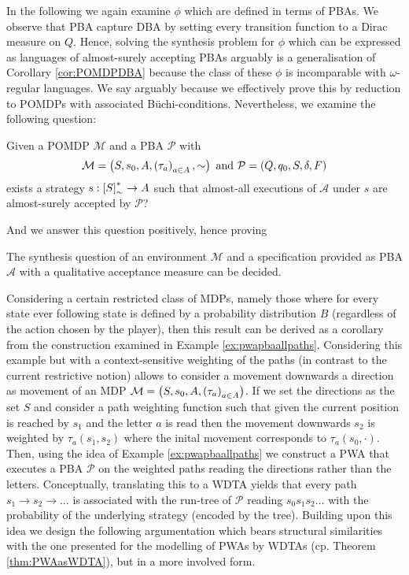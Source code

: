In the following we again examine $\phi$ which are defined in terms of 
\acp{PBA}. We observe that \ac{PBA} capture \ac{DBA} by setting every 
transition function to a Dirac measure on $Q$. Hence, solving the synthesis 
problem for $\phi$ which can be expressed as languages of almost-surely 
accepting \acp{PBA} arguably is a generalisation of Corollary 
\ref{cor:POMDPDBA} because the class of these $\phi$ is incomparable with 
$\omega$-regular languages. We say arguably because we effectively prove this
by reduction to \acp{POMDP} with associated Büchi-conditions. Nevertheless, we 
examine the following question:
\begin{definition}
  Given a \ac{POMDP} $\mathcal{M}$ and a \ac{PBA} $\mathcal{P}$ with
  \begin{equation*}
    \mathcal{M} = \left(S, s_{0}, A, \left(\tau_{a}\right)_{a\in A}, \sim\right)
  \text{ and }
    \mathcal{P} = \left(Q, q_{0}, S, \delta, F\right)
  \end{equation*}
  exists a strategy $s:\left[S\right]_{\sim}^{*}\rightarrow A$ such that 
  almost-all executions of $\mathcal{A}$ under $s$ are almost-surely accepted 
  by $\mathcal{P}$?
  \label{def:pbastratsynthesis}
\end{definition}
And we answer this question positively, hence proving
\begin{theorem}
  The synthesis question of an environment $\mathcal{M}$ and a specification
  provided as \ac{PBA} $\mathcal{A}$ with a qualitative acceptance measure
  can be decided.
  \label{thm:pbasynthesis}
\end{theorem}
Considering a certain restricted class of \acp{MDP}, namely those where for 
every state ever following state is defined by a probability distribution $B$
(regardless of the action chosen by the player), then this result can be 
derived as a corollary from the construction examined in Example 
\ref{ex:pwapbaallpaths}. Considering this example but with a context-sensitive
weighting of the paths (in contrast to the current restrictive notion) allows 
to consider a movement downwards a direction as movement of an \ac{MDP} 
$\mathcal{M} = \left(S, s_{0}, A, \left(\tau_{a}\right)_{a\in A}\right)$. If we set the
directions as the set $S$ and consider a path weighting function such that
given the current position is reached by $s_{1}$ and the letter $a$ is read 
then the movement downwards $s_{2}$ is weighted by $\tau_{a}(s_{1}, s_{2})$ 
where the inital movement corresponds to $\tau_{a}(s_{0}, \cdot)$. Then, using
the idea of Example \ref{ex:pwapbaallpaths} we construct a \ac{PWA} that 
executes a \ac{PBA} $\mathcal{P}$ on the weighted paths reading the directions
rather than the letters. Conceptually, translating this to a \ac{WDTA} yields
that every path $s_{1}\rightarrow s_{2}\rightarrow\dots$ is associated with the
run-tree of $\mathcal{P}$ reading $s_{0}s_{1}s_{2}\dots$ with the probability
of the underlying strategy (encoded by the tree). Building upon this idea we
design the following argumentation which bears structural similarities with the 
one presented for the modelling of \acp{PWA} by \acp{WDTA} (cp. Theorem 
\ref{thm:PWAasWDTA}), but in a more involved form.

